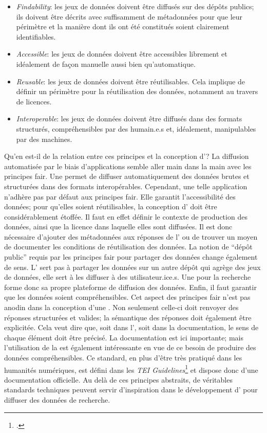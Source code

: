 \begin{itemize}
	\item \textit{Findability}: les jeux de données doivent être diffusés sur des dépôts publics; ils doivent être décrits avec suffisamment de métadonnées pour que leur périmètre et la manière dont ils ont été constitués soient clairement identifiables.
	\item \textit{Accessible}: les jeux de données doivent être accessibles librement et idéalement de façon manuelle aussi bien qu'automatique.
	\item \textit{Reusable}: les jeux de données doivent être réutilisables. Cela implique de définir un périmètre pour la réutilisation des données, notamment au travers de licences.
	\item \textit{Interoperable}: les jeux de données doivent être diffusés dans des formats structurés, compréhensibles par des humain.e.s et, idéalement, manipulables par des machines.
\end{itemize}

Qu'en est-il de la relation entre ces principes et la conception d'\api{}? La diffusion automatisée par le biais d'applications semble aller main dans la main avec les principes \gls{fair}. Une \api{} permet de diffuser automatiquement des données brutes et structurées dans des formats interopérables. Cependant, une telle application n'adhère pas par défaut aux principes \gls{fair}. Elle garantit l'accessibilité des données; pour qu'elles soient réutilisables, la conception d'\api{} doit être considérablement étoffée. Il faut en effet définir le contexte de production des données, ainsi que la licence dans laquelle elles sont diffusées. Il est donc nécessaire d'ajouter des métadonnées aux réponses de l'\api{} ou de trouver un moyen de documenter les conditions de réutilisation des données. La notion de \enquote{dépôt public} requis par les principes \gls{fair} pour partager des données change également de sens. L'\api{} sert pas à partager les données sur un autre dépôt qui agrège des jeux de données, elle sert à les diffuser à des utilisateur.ice.s. Une \api{} pour la recherche forme donc sa propre plateforme de diffusion des données. Enfin, il faut garantir que les données soient compréhensibles. Cet aspect des principes \gls{fair} n'est pas anodin dans la conception d'une \api{}. Non seulement celle-ci doit renvoyer des réponses structurées et valides; la sémantique des réponses doit également être explicitée. Cela veut dire que, soit dans l'\api{}, soit dans la documentation, le sens de chaque élément doit être précisé. La documentation est ici importante; mais l'utilisation de la \tei{} est également intéressante en vue de ce besoin de produire des données compréhensibles. Ce standard, en plus d'être très pratiqué dans les humanités numériques, est défini dans les \textit{TEI Guidelines}\footcite{tei_consortium_p5_2022} et dispose donc d'une documentation officielle. Au delà de ces principes abstraits, de véritables standards techniques peuvent servir d'inspiration dans le développement d'\api{} pour diffuser des données de recherche.

